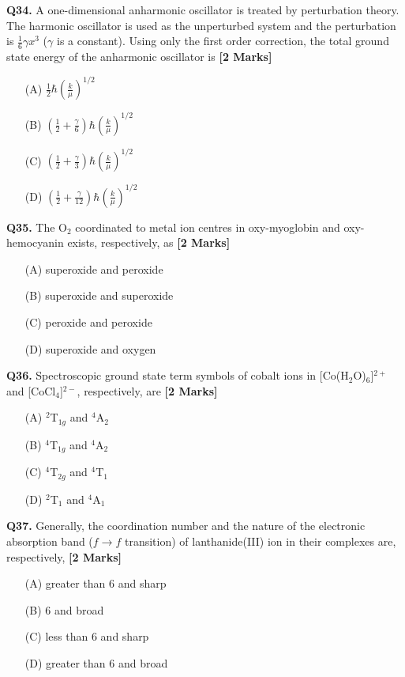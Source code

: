 \documentclass[11pt]{article}
\newcommand{\questionb}[2]{
    \noindent\textbf{Q#2.} #1 \hfill \textbf{[2 Marks]}
}
\begin{document}
\questionb{A one-dimensional anharmonic oscillator is treated by perturbation theory. The harmonic oscillator is used as the unperturbed system and the perturbation is $\frac{1}{6}\gamma x^3$ ($\gamma$ is a constant). Using only the first order correction, the total ground state energy of the anharmonic oscillator is}{34}
\begin{enumerate}
    \item[(A)] $\frac{1}{2}\hbar\left(\frac{k}{\mu}\right)^{1/2}$
    \item[(B)] $\left(\frac{1}{2} + \frac{\gamma}{6}\right)\hbar\left(\frac{k}{\mu}\right)^{1/2}$
    \item[(C)] $\left(\frac{1}{2} + \frac{\gamma}{3}\right)\hbar\left(\frac{k}{\mu}\right)^{1/2}$
    \item[(D)] $\left(\frac{1}{2} + \frac{\gamma}{12}\right)\hbar\left(\frac{k}{\mu}\right)^{1/2}$
\end{enumerate}
\vspace{0.5cm}

\questionb{The O$_2$ coordinated to metal ion centres in oxy-myoglobin and oxy-hemocyanin exists, respectively, as}{35}
\begin{enumerate}
    \item[(A)] superoxide and peroxide
    \item[(B)] superoxide and superoxide
    \item[(C)] peroxide and peroxide
    \item[(D)] superoxide and oxygen
\end{enumerate}
\vspace{0.5cm}

\questionb{Spectroscopic ground state term symbols of cobalt ions in [Co(H$_2$O)$_6$]$^{2+}$ and [CoCl$_4$]$^{2-}$, respectively, are}{36}
\begin{enumerate}
    \item[(A)] $^2$T$_{1g}$ and $^4$A$_2$
    \item[(B)] $^4$T$_{1g}$ and $^4$A$_2$
    \item[(C)] $^4$T$_{2g}$ and $^4$T$_1$
    \item[(D)] $^2$T$_1$ and $^4$A$_1$
\end{enumerate}
\vspace{0.5cm}

\questionb{Generally, the coordination number and the nature of the electronic absorption band ($f \rightarrow f$ transition) of lanthanide(III) ion in their complexes are, respectively,}{37}
\begin{enumerate}
    \item[(A)] greater than 6 and sharp
    \item[(B)] 6 and broad
    \item[(C)] less than 6 and sharp
    \item[(D)] greater than 6 and broad
\end{enumerate}
\vspace{0.5cm}
\end{document}
